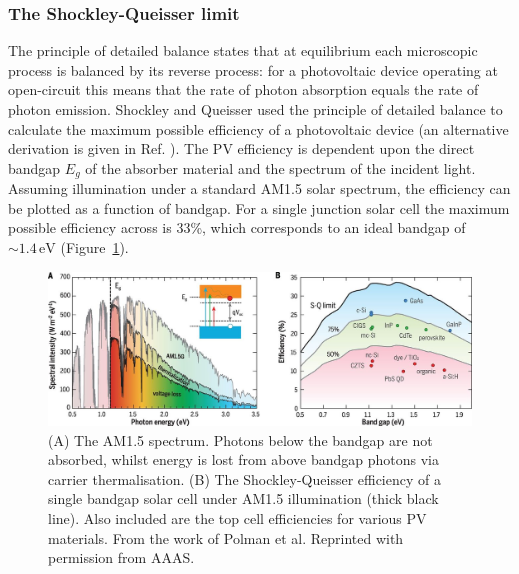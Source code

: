 \subsubsection{The Shockley-Queisser limit}\label{sec:SQlimit}
The principle of detailed balance states that at equilibrium each microscopic process is balanced by its reverse process: for a photovoltaic device operating at open-circuit this means that the rate of photon absorption equals the rate of photon emission. Shockley and Queisser used the principle of detailed balance to calculate the maximum possible efficiency of a photovoltaic device\autocite{Shockley1961} (an alternative derivation is given in Ref. \cite{Nelson2003}). The PV efficiency is dependent upon the direct bandgap $E_g$ of the absorber material and the spectrum of the incident light. Assuming illumination under a standard AM1.5 solar spectrum, the efficiency can be plotted as a function of bandgap. For a single junction solar cell the maximum possible efficiency across is 33\%, which corresponds to an ideal bandgap of $\sim 1.4\,\text{eV}$ (Figure\ \ref{SQlimit}). 

\begin{figure}[h]
\centering
   \includegraphics[width=1.0\columnwidth]{figures/ch1/SQlimit.jpg}
   \caption[AM1.5 spectral intensity and Shockley-Queisser efficiency]{(A) The AM1.5 spectrum. Photons below the bandgap are not absorbed, whilst energy is lost from above bandgap photons via carrier thermalisation. (B) The Shockley-Queisser efficiency of a single bandgap solar cell under AM1.5 illumination (thick black line). Also included are the top cell efficiencies for various PV materials. From the work of Polman et al.\autocite{Polman2016} Reprinted with permission from AAAS.\autocite{AAASpermission}}
   \label{SQlimit}
\end{figure}

